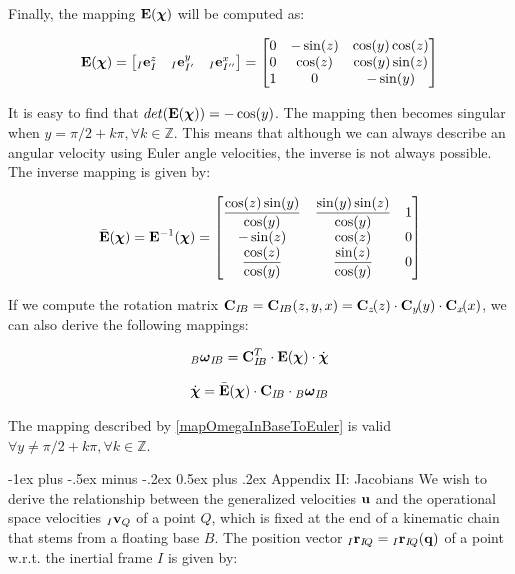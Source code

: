\documentclass[10pt,landscape,a4paper]{article}
\makeatletter
\renewcommand{\section}{\@startsection{section}{1}{0mm}%
                               {-1ex plus -.5ex minus -.2ex}%
                                {0.5ex plus .2ex}%
                                {\normalfont\large\bfseries}}
\newcommand\pos[3]{{}_#1\vr_{#2\!#3}}
\newcommand\comat[2]{\vC_{#1\!#2}}
\newcommand\rotvel[3]{{}_#1\vom_{#2\!#3}}
\newcommand\dvch[0]{\dot{\vch}}
\makeatother
\begin{document}
\begin{multicols}{2}
Finally, the mapping $\mathbf E(\mbox{\boldmath $\chi$})$ will be computed as:

\begin{equation}
\mathbf E(\mbox{\boldmath $\chi$}) =
\begin{bmatrix}
{}_I \mathbf e^z_I & {}_I \mathbf e^y_{I'} & {}_I \mathbf e^x_{I''}
\end{bmatrix}
=
\begin{bmatrix}
0 & -\sin(z) 	& \cos(y)\cos(z) \\
0 &  \cos(z) 	& \cos(y)\sin(z) \\
1 &  0			& -\sin(y)		 \\
\end{bmatrix}
\end{equation}

It is easy to find that $det(\mathbf E(\mbox{\boldmath $\chi$})) = -\cos(y)$. The mapping then becomes singular when $y = \pi/2 + k\pi, \forall k \in \mathbb{Z}$. This means that although we can always describe an angular velocity using Euler angle velocities, the inverse is not always possible. The inverse mapping is given by:

\begin{equation}
\bar{\mathbf E}(\mbox{\boldmath $\chi$}) =
\mathbf E^{-1}(\mbox{\boldmath $\chi$}) =
\begin{bmatrix}
\dfrac{\cos(z)\sin(y)}{\cos(y)} &	\dfrac{\sin(y)\sin(z)}{\cos(y)} & 1 \\
-\sin(z)						&	\cos(z) 						& 0 \\
\dfrac{\cos(z)}{\cos(y)} 		& \dfrac{\sin(z)}{\cos(y)} 			& 0
\end{bmatrix}
\end{equation}

If we compute the rotation matrix $\comat{I}{B} = \comat{I}{B}(z,y,x) = \comat{z}{}(z) \cdot \comat{y}{}(y) \cdot \comat{x}{}(x)$, we can also derive the following mappings:

\begin{equation}\label{mapEulerToOmegainBase}
\rotvel{B}{I}{B} = \comat{I}{B}^T \cdot \vE(\vch) \cdot \dot{\vch}
\end{equation}

\begin{equation}\label{mapOmegaInBaseToEuler}
\dvch = \bar{\vE}(\vch) \cdot \comat{I}{B}  \cdot \rotvel{B}{I}{B}
\end{equation}

The mapping described by \eqref{mapOmegaInBaseToEuler} is valid $\forall y \ne \pi/2 + k\pi, \forall k \in \mathbb{Z}$.


\section{Appendix II: Jacobians}
We wish to derive the relationship between the generalized velocities $\mathbf u$ and the operational space velocities ${}_I\mathbf v_{Q}$ of a point $Q$, which is fixed at the end of a kinematic chain that stems from a floating base $B$. The position vector $\pos{I}{I}{Q} = \pos{I}{I}{Q}(\vq)$ of a point w.r.t. the inertial frame $I$ is given by:


\end{multicols}
\end{document}
